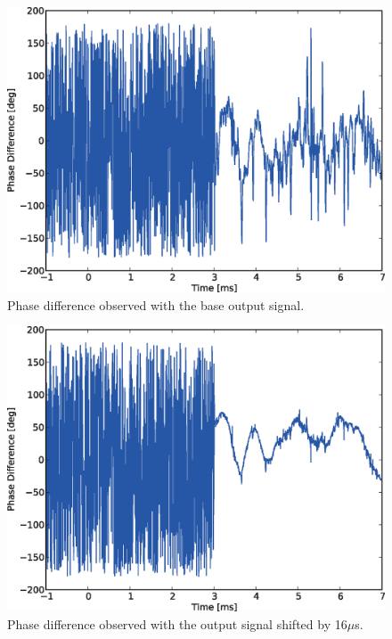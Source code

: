 \begin{figure}[t]
 \centering
 \includegraphics[width=\hsize]{eps/75221_base.eps}
 \caption{Phase difference observed with the base output signal.}
 \label{fig:phase_base}
\end{figure}
\begin{figure}[t]
 \centering
 \includegraphics[width=\hsize]{eps/75221_shifted.eps}
 \caption{Phase difference observed with the output signal shifted by 16$\mu$s.}
 \label{fig:phase_shifted}
\end{figure}

